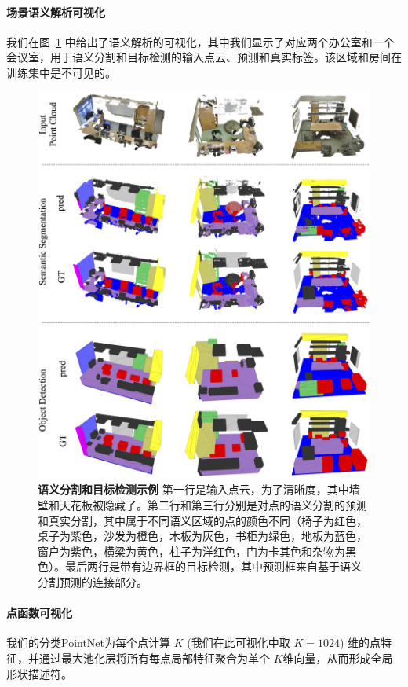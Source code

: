 \paragraph{场景语义解析可视化}
我们在图~\ref{fig:semantic_large} 中给出了语义解析的可视化，其中我们显示了对应两个办公室和一个会议室，用于语义分割和目标检测的输入点云、预测和真实标签。该区域和房间在训练集中是不可见的。


\begin{figure}
    \centering
    \includegraphics[width=\linewidth]{fig/semantic_large.jpg}
    \caption{\textbf{语义分割和目标检测示例}    第一行是输入点云，为了清晰度，其中墙壁和天花板被隐藏了。第二行和第三行分别是对点的语义分割的预测和真实分割，其中属于不同语义区域的点的颜色不同（椅子为红色，桌子为紫色，沙发为橙色，木板为灰色，书柜为绿色，地板为蓝色，窗户为紫色，横梁为黄色，柱子为洋红色，门为卡其色和杂物为黑色）。最后两行是带有边界框的目标检测，其中预测框来自基于语义分割预测的连接部分。}
    \label{fig:semantic_large}
\end{figure}

\paragraph{点函数可视化} 我们的分类PointNet为每个点计算 $K$ (我们在此可视化中取 $K=1024$) 维的点特征，并通过最大池化层将所有每点局部特征聚合为单个 $K$维向量，从而形成全局形状描述符。

